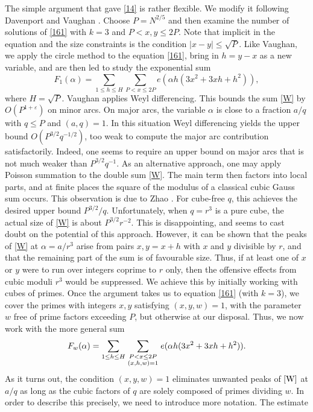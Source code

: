 \documentclass[reqno]{amsart}
\newcommand{\multsum}[2]{\sum_{{\scriptstyle #1}\atop {\scriptstyle #2}}}
\numberwithin{equation}{section}
\begin{document}
The simple argument that gave \eqref{14} is rather flexible. We modify it following Davenport \cite{D} and Vaughan \cite{V85}. Choose $P=N^{2/5}$ and then examine the number of solutions of \eqref{161} with $k=3$ and
$P<x,y\le 2P$. Note that implicit in the equation and the size constraints is the condition $|x-y|\le\surd P$. Like Vaughan, we apply the circle method to the equation \eqref{161},  bring in $h=y-x$ as a new variable, and are then led to study the exponential sum
\begin{equation}\label{W} F_1(\alpha) = \sum_{1\le h\le H} \sum_{P<x\le 2P}
e(\alpha  h(3x^2+3xh +h^2)), \end{equation}
where $H=\surd P$.
Vaughan \cite{V85} applies Weyl differencing. This bounds the sum \eqref{W} by $O(P^{1+\varepsilon})$ on minor arcs. On major arcs, the variable $\alpha$ is close to a fraction $a/q$ with $q\le P$ and $(a,q)=1$. In this situation Weyl differencing  yields the upper bound $O(P^{3/2}q^{-1/2})$, too weak to compute the major arc contribution satisfactorily. Indeed, one seems to require an upper bound on major arcs that is not much weaker than $P^{3/2}q^{-1}$. As an alternative approach, one may apply Poisson summation to the double sum \eqref{W}. The main term then factors into local parts, and at finite places the square of the modulus  of a classical cubic Gauss sum occurs. This observation is due to Zhao \cite{Z}. For cube-free $q$, this achieves the desired upper bound $P^{3/2}/q$. Unfortunately, when $q=r^3$ is a pure cube, the actual size of \eqref{W} is about $P^{3/2}r^{-2}$. This is disappointing, and seems to cast doubt on the potential of this approach. However, it can be shown that the peaks of \eqref{W} at $\alpha=a/r^3$ arise from pairs $x,y=x+h$ with $x$ and $y$ divisible by $r$, and that the remaining part of the sum is of favourable size. Thus, if at least one of $x$ or $y$ were to run over integers coprime to $r$ only, then the offensive effects from cubic moduli $r^3$ would be suppressed. We achieve this by initially working with cubes of primes. Once the argument takes us to equation \eqref{161} (with $k=3$), we cover the primes with integers $x,y$ satisfying $(x,y,w)=1$, with the parameter $w$ free of prime factors exceeding $P$, but otherwise at our disposal. Thus, we now work with the more general sum
\begin{equation}\label{33} F_w(\alpha) = \sum_{1\le h\le H} \multsum{P<x\le 2P}{(x,h,w)=1}
e(\alpha  h(3x^2+3xh +h^2)). \end{equation}
As it turns out, the condition  $(x,y,w)=1$ eliminates unwanted peaks of $\eqref{W}$ at $a/q$ as long as the cubic factors of $q$ are solely composed of primes dividing $w$. In  order to describe this precisely, we need to introduce more notation. The estimate 
\end{document}
